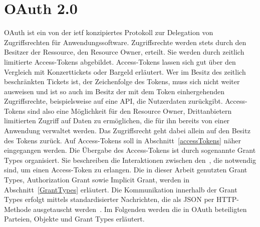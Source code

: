 \chapter{OAuth 2.0} \gls{OAuth} ist ein von der \gls{ietf} konzipiertes
Protokoll zur Delegation von Zugriffsrechten für Anwendungssoftware.
Zugriffsrechte werden stets durch den Besitzer der Ressource, den Resource Owner,
erteilt. Sie werden durch zeitlich limitierte Access-Tokens abgebildet.
Access-Tokens lassen sich gut über den Vergleich mit Konzerttickets oder Bargeld
erläutert. Wer im Besitz des zeitlich beschränkten Tickets ist, der Zeichenfolge
des Tokens, muss sich nicht weiter ausweisen und ist so auch im Besitz der mit
dem Token einhergehenden Zugriffsrechte,
beispielsweise auf eine API, die Nutzerdaten zurückgibt. Access-Tokens sind also
eine Möglichkeit für den Resource Owner, Drittanbietern limitierten Zugriff auf Daten
zu ermöglichen, die für ihn bereits von einer Anwendung verwaltet werden. Das
Zugriffsrecht geht dabei allein auf den Besitz des Tokens zurück. Auf
Access-Tokens soll in Abschnitt~\ref{accessTokens} näher eingegangen werden. Die
Übergabe des Access-Tokens ist durch sogenannte \glspl{Grant Type} organisiert.
Sie beschreiben die Interaktionen zwischen den~, die notwendig
sind, um einen Access-Token zu erlangen. Die in dieser Arbeit genutzten
\glspl{Grant Type}, Authorization Grant sowie Implicit Grant, werden in
Abschnitt~\ref{GrantTypes} erläutert. Die Kommunikation innerhalb der
\glspl{Grant Type} erfolgt mittels standardisierter Nachrichten, die als JSON
per HTTP-Methode ausgetauscht werden~. Im Folgenden
werden die in \gls{OAuth} beteiligten Parteien, Objekte und \glspl{Grant Type}
erläutert.





